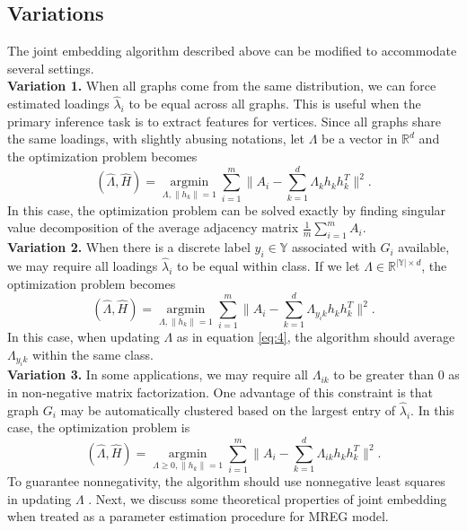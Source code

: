 \documentclass[10pt,journal,compsoc]{IEEEtran}
\begin{document}
\subsection{Variations}
The joint embedding algorithm described above can be modified to accommodate several settings. \\
\textbf{Variation 1.} When all graphs come from the same distribution, we can force estimated loadings $\hat{\lambda}_i$ to be equal across all graphs. This is useful when the primary inference task is to extract features for vertices. Since all graphs share the same loadings, with slightly abusing notations, let $\Lambda$ be a vector in $\mathbb{R}^d$ and the optimization problem becomes
\[ (\hat{\Lambda},\hat{H}) = \underset{\Lambda,\|h_k\|=1}{\operatorname{argmin}} \sum\limits_{i=1}^{m} \| A_i- \sum\limits_{k=1}^{d} \Lambda_{k} h_k h_k^T \|  ^2.  \] 
In this case, the optimization problem can be solved exactly by finding singular value decomposition of the average adjacency matrix $\frac{1}{m}\sum\limits_{i=1}^{m}A_i$. \\
\textbf{Variation 2.} When there is a discrete label $y_i \in \mathbb{Y}$ associated with $G_i$ available, we may require all loadings $\hat{\lambda}_i$ to be equal within class. If we let $\Lambda \in \mathbb{R}^{|\mathbb{Y}| \times d}$, the optimization problem becomes
\[ (\hat{\Lambda},\hat{H}) = \underset{\Lambda,\|h_k\|=1}{\operatorname{argmin}} \sum\limits_{i=1}^{m} \| A_i- \sum\limits_{k=1}^{d} \Lambda_{y_i k} h_k h_k ^T \|  ^2.  \] 
In this case, when updating $\Lambda$ as in equation \ref{eq:4}, the algorithm should average $\Lambda_{y_i k}$ within the same class. \\
\textbf{Variation 3.} In some applications, we may require all $\Lambda_{ik}$ to be greater than $0$ as in non-negative matrix factorization. One advantage of this constraint is that graph $G_i$ may be automatically clustered  based on the largest entry of $\hat{\lambda}_{i}$. In this case, the optimization problem is
\[ (\hat{\Lambda},\hat{H}) = \underset{\Lambda \geq 0,\|h_k\|=1}{\operatorname{argmin}} \sum\limits_{i=1}^{m} \| A_i- \sum\limits_{k=1}^{d} \Lambda_{ik} h_k h_k ^T \|  ^2.  \] 
To guarantee nonnegativity, the algorithm should use nonnegative least squares in updating $\Lambda$ \cite{kim2008nonnegative}. Next, we discuss some theoretical properties of joint embedding when treated as a parameter estimation procedure for MREG model.
\end{document}

